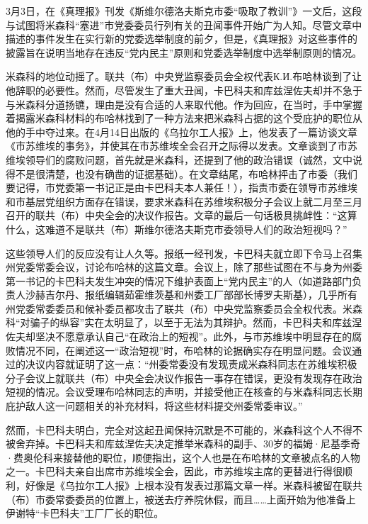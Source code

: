 3月3日，在《真理报》刊发《斯维尔德洛夫斯克市委“吸取了教训”》一文后，这段与试图将米森科“塞进”市党委委员行列有关的丑闻事件开始广为人知。尽管文章中描述的事件发生在实行新的党委选举制度的前夕，但是，《真理报》对这些事件的披露旨在说明当地存在违反“党内民主”原则和党委选举制度中选举制原则的情况。

米森科的地位动摇了。联共（布）中央党监察委员会全权代表К.И.布哈林谈到了让他辞职的必要性。然而，尽管发生了重大丑闻，卡巴科夫和库兹涅佐夫却并不急于与米森科分道扬镳，理由是没有合适的人来取代他。作为回应，在当时，手中掌握着揭露米森科材料的布哈林找到了一种方法来把米森科占据的这个受庇护的职位从他的手中夺过来。在4月14日出版的《乌拉尔工人报》上，他发表了一篇访谈文章《市苏维埃的事务》，并使其在市苏维埃全会召开之际得以发表。文章谈到了市苏维埃领导们的腐败问题，首先就是米森科，还提到了他的政治错误（诚然，文中说得不是很清楚，也没有确凿的证据基础）。在文章结尾，布哈林抨击了市委（我们要记得，市党委第一书记正是由卡巴科夫本人兼任！），指责市委在领导市苏维埃和市基层党组织方面存在错误，要求米森科在苏维埃积极分子会议上就二月至三月召开的联共（布）中央全会的决议作报告。文章的最后一句话极具挑衅性：“这算什么，这难道不是联共（布）斯维尔德洛夫斯克市委领导人们的政治短视吗？”

这些领导人们的反应没有让人久等。报纸一经刊发，卡巴科夫就立即下令马上召集州党委常委会议，讨论布哈林的这篇文章。会议上，除了那些试图在不与身为州委第一书记的卡巴科夫发生冲突的情况下维护表面上“党内民主”的人（如道路部门负责人沙赫吉尔丹、报纸编辑茹霍维茨基和州委工厂部部长博罗夫斯基），几乎所有州党委常委委员和候补委员都攻击了联共（布）中央党监察委员会全权代表。米森科“对骗子的纵容”实在太明显了，以至于无法为其辩护。然而，卡巴科夫和库兹涅佐夫却坚决不愿意承认自己“在政治上的短视”。此外，与市苏维埃中明显存在的腐败情况不同，在阐述这一“政治短视”时，布哈林的论据确实存在明显问题。会议通过的决议内容就证明了这一点：“州委常委没有发现责成米森科同志在苏维埃积极分子会议上就联共（布）中央全会决议作报告一事存在错误，更没有发现存在政治短视的情况。会议受理布哈林同志的声明，并接受他正在核查的与米森科同志长期庇护敌人这一问题相关的补充材料，将这些材料提交州委常委审议。”

然而，卡巴科夫明白，完全对这起丑闻保持沉默是不可能的，米森科这个人不得不被舍弃掉。卡巴科夫和库兹涅佐夫决定推举米森科的副手、30岁的福姆·尼基季奇·费奥伦科来接替他的职位，顺便指出，这个人也是在布哈林的文章被点名的人物之一。卡巴科夫亲自出席市苏维埃全会，因此，市苏维埃主席的更替进行得很顺利，好像是《乌拉尔工人报》上根本没有发表过那篇文章一样。米森科被留在联共（布）市委常委委员的位置上，被送去疗养院休假，而且……上面开始为他准备上伊谢特“卡巴科夫”工厂厂长的职位。

